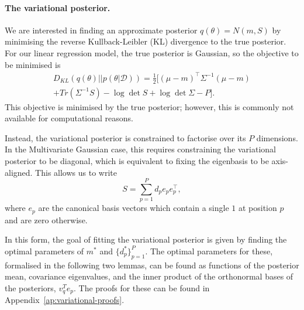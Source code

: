 \documentclass{article}
\theoremstyle{plain}
\theoremstyle{definition}
\theoremstyle{remark}
\theoremstyle{plain}
\newcommand{\data}{\mathcal{D}}
\newcommand{\posterior}{\Sigma}
\newcommand{\KL}[2]{D_{KL}\left(#1||#2\right)}
\begin{document}
\paragraph{The variational posterior.}
We are interested in finding an approximate posterior $q(\theta) = N(m,S)$ by minimising the reverse Kullback-Leibler (KL) divergence to the true posterior. For our linear regression model, the true posterior is Gaussian, so the objective to be minimised is
\begin{multline}
    \KL{q(\theta)}{p(\theta| \data)} = \frac{1}{2} \big[(\mu - m)^\top  \posterior^{-1} (\mu - m) \\ + Tr(\posterior^{-1}S) - \log \det S + \log \det \posterior -P \big].
\end{multline}
This objective is minimised by the true posterior; however, this is commonly not available for computational reasons. 

Instead, the variational posterior is constrained to factorise over its $P$ dimensions. In the Multivariate Gaussian case, this requires constraining the variational posterior to be diagonal, which is equivalent to fixing the eigenbasis to be axis-aligned. This allows us to write 
\begin{equation}
    S =  \sum_{p=1}^P d_{p} e_p e_p^\top, 
\end{equation}
where $e_p$ are the canonical basis vectors which contain a single $1$ at position $p$ and are zero otherwise. %

In this form, the goal of fitting the variational posterior is given by finding the optimal parameters of $m^*$ and $\{d^*_p\}_{p=1}^P$. The optimal parameters for these, formalised in the following two lemmas, can be found as functions of the posterior mean, covariance eigenvalues, and the inner product of the orthonormal bases of the posteriors, $v_q^T e_p$. The proofs for these can be found in Appendix~\ref{ap:variational-proofs}.

\end{document}
